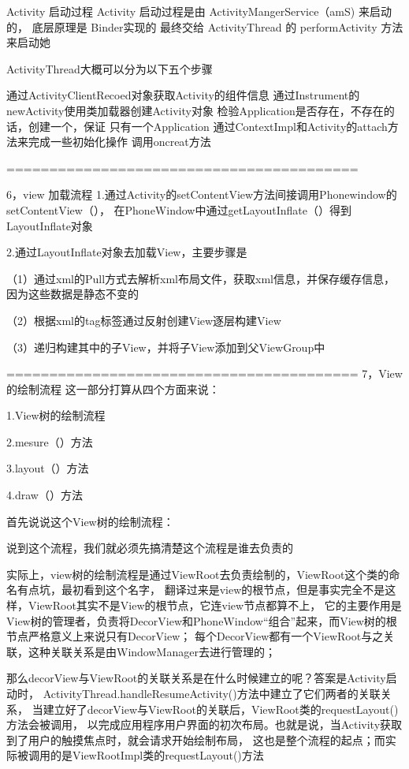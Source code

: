 Activity 启动过程
Activity 启动过程是由 ActivityMangerService（amS) 来启动的，
底层原理是 Binder实现的 最终交给 ActivityThread 的 performActivity 方法来启动她

ActivityThread大概可以分为以下五个步骤

通过ActivityClientRecoed对象获取Activity的组件信息
通过Instrument的newActivity使用类加载器创建Activity对象
检验Application是否存在，不存在的话，创建一个，保证 只有一个Application
通过ContextImpl和Activity的attach方法来完成一些初始化操作
调用oncreat方法

=========================================

6，view 加载流程
1.通过Activity的setContentView方法间接调用Phonewindow的setContentView（），
  在PhoneWindow中通过getLayoutInflate（）得到LayoutInflate对象

2.通过LayoutInflate对象去加载View，主要步骤是

（1）通过xml的Pull方式去解析xml布局文件，获取xml信息，并保存缓存信息，因为这些数据是静态不变的

（2）根据xml的tag标签通过反射创建View逐层构建View

（3）递归构建其中的子View，并将子View添加到父ViewGroup中

=========================================
7，View的绘制流程
  这一部分打算从四个方面来说：

  1.View树的绘制流程

  2.mesure（）方法

  3.layout（）方法

  4.draw（）方法

  首先说说这个View树的绘制流程：

  说到这个流程，我们就必须先搞清楚这个流程是谁去负责的

  实际上，view树的绘制流程是通过ViewRoot去负责绘制的，ViewRoot这个类的命名有点坑，最初看到这个名字，
  翻译过来是view的根节点，但是事实完全不是这样，ViewRoot其实不是View的根节点，它连view节点都算不上，
  它的主要作用是View树的管理者，负责将DecorView和PhoneWindow“组合”起来，而View树的根节点严格意义上来说只有DecorView；
  每个DecorView都有一个ViewRoot与之关联，这种关联关系是由WindowManager去进行管理的；

  那么decorView与ViewRoot的关联关系是在什么时候建立的呢？答案是Activity启动时，
  ActivityThread.handleResumeActivity()方法中建立了它们两者的关联关系，
  当建立好了decorView与ViewRoot的关联后，ViewRoot类的requestLayout()方法会被调用，
  以完成应用程序用户界面的初次布局。也就是说，当Activity获取到了用户的触摸焦点时，就会请求开始绘制布局，
  这也是整个流程的起点；而实际被调用的是ViewRootImpl类的requestLayout()方法



